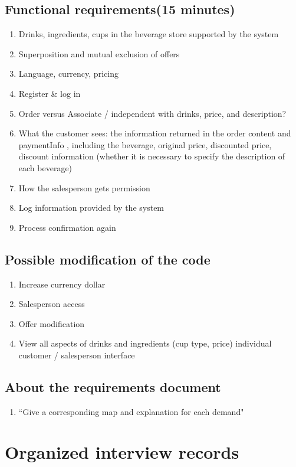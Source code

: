 \documentclass[a4paper]{report}
\begin{document}
\subsection{Functional requirements(15 minutes)}
\begin{enumerate}
\item Drinks, ingredients, cups in the beverage store supported by the system 
\item Superposition and mutual exclusion of offers 
\item Language, currency, pricing 
\item Register \& log in 
\item Order versus Associate / independent with drinks, price, and description?
\item What the customer sees: the information returned in the order content and paymentInfo , including the beverage, original price, discounted price, discount information (whether it is necessary to specify the description of each beverage) 
\item How the salesperson gets permission 
\item Log information provided by the system 
\item Process confirmation again
\end{enumerate}
\subsection{Possible modification of the code}
\begin{enumerate}
\item Increase currency dollar 
\item Salesperson access 
\item Offer modification 
\item View all aspects of drinks and ingredients (cup type, price) individual customer / salesperson interface 
\end{enumerate}
\subsection{About the requirements document }
\begin{enumerate}
\item ``Give a corresponding map and explanation for each demand"
\end{enumerate}
\section{Organized interview records}
\end{document}
